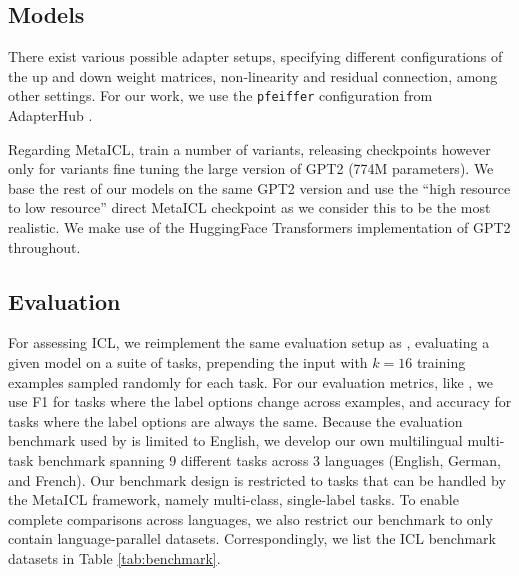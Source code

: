 \documentclass[11pt]{article}
\begin{document}
\subsection{Models}

There exist various possible adapter setups, specifying different configurations of the up and down
weight matrices, non-linearity and residual connection, among other settings. For our work, we use
the \verb_pfeiffer_ configuration from AdapterHub \citep{pfeiffer_adapterhub_2020}.

Regarding MetaICL, \citet{min_metaicl_2022} train a number of variants, releasing checkpoints
however only for variants fine tuning the large version of GPT2 (774M parameters). We base the rest
of our models on the same GPT2 version and use the ``high resource to low resource'' direct MetaICL
checkpoint as we consider this to be the most realistic. We make use of the HuggingFace Transformers
\citep{wolf_transformers_2020} implementation of GPT2 throughout.

\subsection{Evaluation}\label{sec:experiment:eval}

For assessing ICL, we reimplement the same evaluation setup as \citet{min_metaicl_2022}, evaluating
a given model on a suite of tasks, prepending the input with $k=16$ training examples sampled
randomly for each task. For our evaluation metrics, like \citet{min_metaicl_2022}, we use F1 for
tasks where the label options change across examples, and accuracy for tasks where the label options
are always the same. Because the evaluation benchmark used by \citet{min_metaicl_2022} is limited to
English, we develop our own multilingual multi-task benchmark spanning 9 different tasks across
3 languages (English, German, and French). Our benchmark design is restricted to tasks that can be
handled by the MetaICL framework, namely multi-class, single-label tasks. To enable complete
comparisons across languages, we also restrict our benchmark to only contain language-parallel
datasets. Correspondingly, we list the ICL benchmark datasets in Table \ref{tab:benchmark}.
\end{document}
